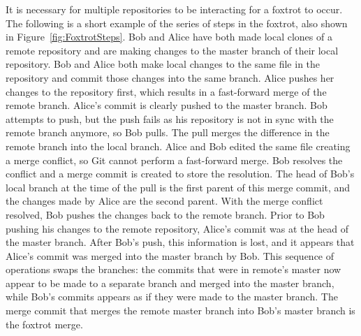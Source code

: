 It is necessary for multiple repositories to be interacting for a
foxtrot to occur.
The following is a short example of the series of steps in the foxtrot,
also shown in Figure~\ref{fig:FoxtrotSteps}.
Bob and Alice have both made local clones of a remote
repository and are making changes to the master branch of their local
repository.
Bob and Alice both make local changes to the same file in the
repository and commit those changes into the same branch.
Alice pushes her changes to the repository first, which results in a
fast-forward merge of the remote branch.
Alice's commit is clearly pushed to the master branch.
Bob attempts to push, but the push fails as his repository is not in
sync with the remote branch anymore, so Bob pulls.
The pull merges the difference in the remote branch into the local
branch.
Alice and Bob edited the same file creating a merge conflict, so Git
cannot perform a fast-forward merge.
Bob resolves the conflict and a merge commit is created to store the
resolution.
The head of Bob's local branch at the time of the pull is the first
parent of this merge commit, and the changes made by Alice are the
second parent.
With the merge conflict resolved, Bob pushes the changes back to the
remote branch.
Prior to Bob pushing his changes to the remote repository, Alice's
commit was at the head of the master branch.
After Bob's push, this information is lost, and it appears that Alice's
commit was merged into the master branch by Bob.
This sequence of operations swaps the branches: the commits that were in
remote's master now appear to be made to a separate branch and merged
into the master branch, while Bob's commits appears as if they were made
to the master branch.
The merge commit that merges the remote master branch into Bob's master
branch is the foxtrot merge.


